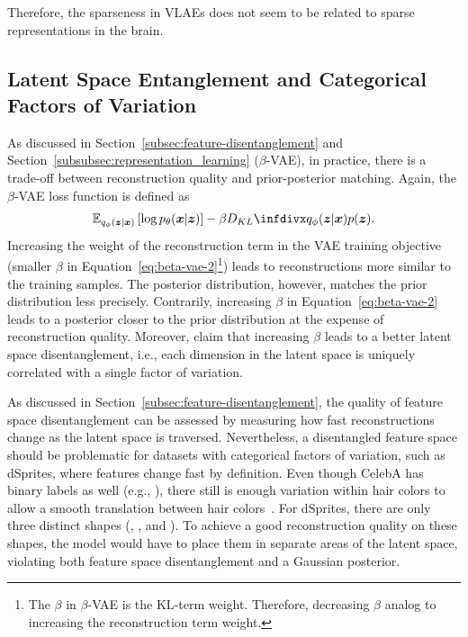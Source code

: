 Therefore, the sparseness in \acp{VLAE} does not seem to be related to sparse representations in the brain.

\subsection{Latent Space Entanglement and Categorical Factors of Variation}\label{subsec:latent-space-entanglement-and-categorical-factors-of-variation}

As discussed in Section~\ref{subsec:feature-disentanglement} and Section~\ref{subsubsec:representation_learning} ($\beta$-\ac{VAE}), in practice, there is a trade-off between reconstruction quality and prior-posterior matching.
Again, the $\beta$-\ac{VAE} loss function is defined as
\begin{align}
    \mathbb{E}_{q_{\phi}(\bm{z} | \bm{x})}\left[\log p_{\theta}(\bm{x} | \bm{z})\right]-\beta \kldiv{q_{\phi}(\bm{z} | \bm{x})}{p(\bm{z})}. \label{eq:beta-vae-2}
\end{align}
Increasing the weight of the reconstruction term in the \ac{VAE} training objective (smaller $\beta$ in Equation~\ref{eq:beta-vae-2}\footnote{The $\beta$ in $\beta$-\ac{VAE} is the \ac{KL}-term weight. Therefore, decreasing $\beta$ analog to increasing the reconstruction term weight.}) leads to reconstructions more similar to the training samples.
The posterior distribution, however, matches the prior distribution less precisely.
Contrarily, increasing $\beta$ in Equation~\ref{eq:beta-vae-2} leads to a posterior closer to the prior distribution at the expense of reconstruction quality.
Moreover, \citet{higgins2017beta} claim that increasing $\beta$ leads to a better latent space disentanglement, i.e., each dimension in the latent space is uniquely correlated with a single factor of variation.

As discussed in Section~\ref{subsec:feature-disentanglement}, the quality of feature space disentanglement can be assessed by measuring how fast reconstructions change as the latent space is traversed.
Nevertheless, a disentangled feature space should be problematic for datasets with categorical factors of variation, such as dSprites, where features change fast by definition.
Even though CelebA has binary labels as well (e.g., ), there still is enough variation within hair colors to allow a smooth translation between hair colors~\citep{higgins2017beta}.
For dSprites, there are only three distinct shapes (, , and ).
To achieve a good reconstruction quality on these shapes, the model would have to place them in separate areas of the latent space, violating both feature space disentanglement and a Gaussian posterior.


